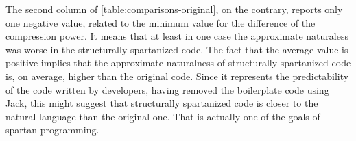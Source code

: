 The second column of \cref{table:comparisons-original}, on the contrary, reports only
one negative value, related to the minimum value for the difference of the compression power.
It means that at least in one case the approximate naturaless was worse in the
structurally spartanized code. The fact that the average value is positive implies
that the approximate naturalness of structurally spartanized
code is, on average, higher than the original code. Since it represents the predictability of
the code written by developers, having removed the boilerplate code using Jack, this
might suggest that structurally spartanized code is closer to the natural language
than the original one. That is actually one of the goals of spartan programming.



